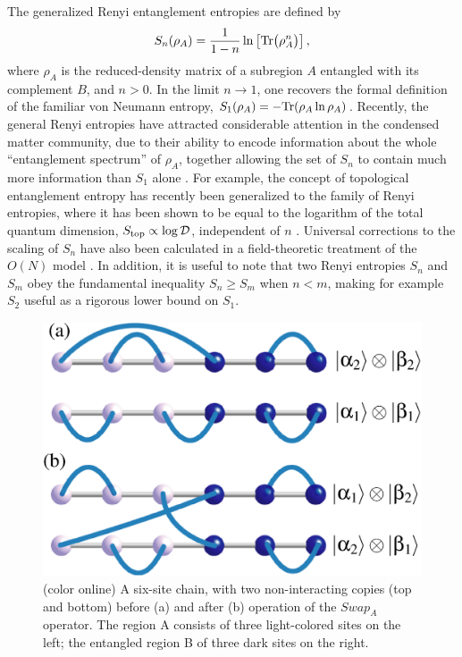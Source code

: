 \documentclass[prl,aps,twocolumn,floatfix,amsmath,amssymb,superscriptaddress,tightenlines]{revtex4}
\begin{document}
The generalized Renyi entanglement entropies are defined by
\begin{equation}
S_{n} (\rho_A) = \frac{1}{1- n} \ln \left[{ {\rm Tr}\big( \rho_A^{n} \big) }\right],
\label{Sn}
\end{equation}
where $\rho_A$ is the reduced-density matrix of a subregion $A$ entangled with its complement $B$, and 
$n>0$.  In the limit $n \rightarrow 1$, one recovers the formal 
definition of the familiar von Neumann entropy, $S_1 (\rho_A) = - {\rm Tr}( \rho_A \ln \rho_A )$.  
Recently, the general Renyi entropies have attracted considerable attention in the condensed matter community, due to their ability to encode
information about the whole ``entanglement spectrum'' of $\rho_A$, together allowing the set of $S_{n}$ to contain 
much more information than $S_1$ alone \cite{Espec}.  For example, the concept of topological entanglement entropy has recently been
generalized to the family of Renyi entropies, where it has been shown to be equal to the logarithm of the total quantum 
dimension, $S_{\rm top} \propto \log {\mathcal D}$, independent of $n$ \cite{PI}.  Universal corrections to the scaling of $S_{n}$ 
have also been calculated in a field-theoretic treatment of the $O(N)$ model \cite{Max}.
In addition, it is useful to note that two Renyi entropies $S_{n}$ and $S_{m}$ obey the fundamental
inequality $S_{n} \geq S_{m}$ when $n < m$, making for example $S_2$ useful as a rigorous
lower bound on $S_1$.  

\begin{figure} {
\includegraphics[width=2.5
in]{swap_2.eps} \caption{(color online) 
\label{swap_2}
A six-site chain, with two non-interacting copies (top and bottom) before (a) and after (b) operation of the $Swap_A$ operator.  
The region A consists of three light-colored sites on the left; the entangled region B of three dark sites on the right.
}
} \end{figure}
\end{document}
